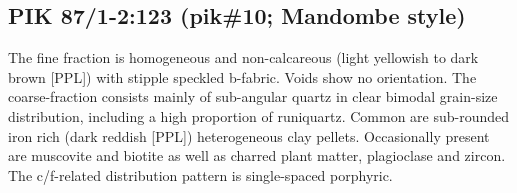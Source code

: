\documentclass[a4paper]{article}
\begin{document}
\begin{figure}[H]
	\caption{}
	\label{fig:55_pik}
\end{figure}

\newpage\subsection{PIK 87/1-2:123 (pik\#10; Mandombe style)}

\begin{multicols}{2}
\noindent The fine fraction is homogeneous and non-calcareous (light yellowish to dark brown [PPL]) with stipple speckled b-fabric. Voids show no orientation. The coarse-fraction consists mainly of sub-angular quartz in clear bimodal grain-size distribution, including a high proportion of runiquartz. Common are sub-rounded iron rich (dark reddish [PPL]) heterogeneous clay pellets. Occasionally present are muscovite and biotite as well as charred plant matter, plagioclase and zircon. The c/f-related distribution pattern is single-spaced porphyric.
\end{multicols}

\end{document}
